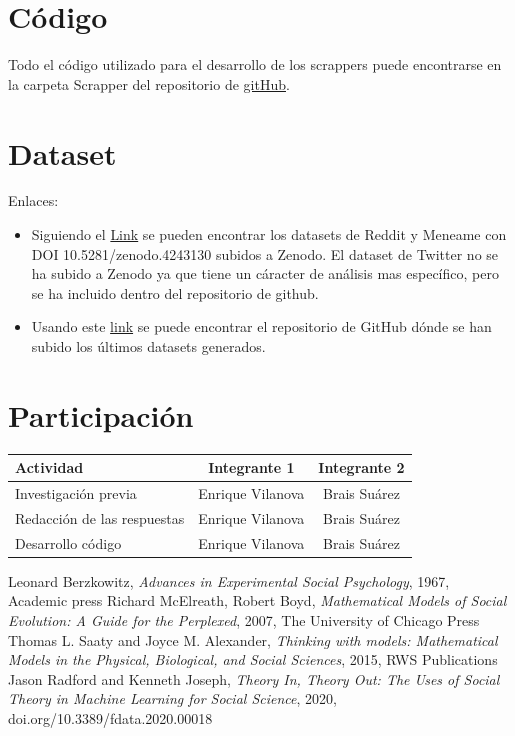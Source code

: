 \documentclass[a4paper,12pt]{article}
\begin{document}
\section{C\'odigo}

Todo el c\'odigo utilizado para el desarrollo de los scrappers puede encontrarse en la carpeta Scrapper del repositorio de \href{https://github.com/Envivi-git/News_analysis.git}{gitHub}.

\section{Dataset}

Enlaces: 

\begin{itemize}

\item Siguiendo el \href{https://zenodo.org/record/4243130}{Link} se  pueden encontrar los datasets de Reddit y Meneame con DOI 10.5281/zenodo.4243130 subidos a Zenodo. El dataset de Twitter no se ha subido a Zenodo ya que tiene un c\'aracter de an\'alisis mas espec\'ifico, pero se ha incluido dentro del repositorio de github.

\item Usando este \href{https://github.com/Envivi-git/News_analysis/tree/main/Dataframes_CSV}{link}  se puede encontrar el repositorio de GitHub d\'onde se han subido los \'ultimos datasets generados. 

\end{itemize}

\section{Participaci\'on}

\begin{tabular}{|l|c|c|}\hline

Actividad& Integrante 1& Integrante 2\\\hline
Investigaci\'on previa & Enrique Vilanova & Brais Su\'arez \\\hline
Redacci\'on de las respuestas & Enrique Vilanova & Brais Su\'arez \\\hline
Desarrollo c\'odigo  & Enrique Vilanova & Brais Su\'arez \\\hline

\end{tabular}

\begin{thebibliography}{9}

 Leonard Berzkowitz,%
	\emph{ Advances in Experimental Social Psychology}, 1967,  Academic press
 Richard McElreath, Robert Boyd,%
	\emph{ Mathematical Models of Social Evolution: A Guide for the Perplexed}, 2007, The University of Chicago Press
Thomas L. Saaty and Joyce M. Alexander,%
	\emph{Thinking with models: Mathematical Models in the Physical, Biological, and Social Sciences}, 2015, RWS Publications
Jason Radford and Kenneth Joseph,%
	\emph{Theory In, Theory Out: The Uses of Social Theory in Machine Learning for Social Science}, 2020, doi.org/10.3389/fdata.2020.00018

\end{thebibliography}
\end{document}
